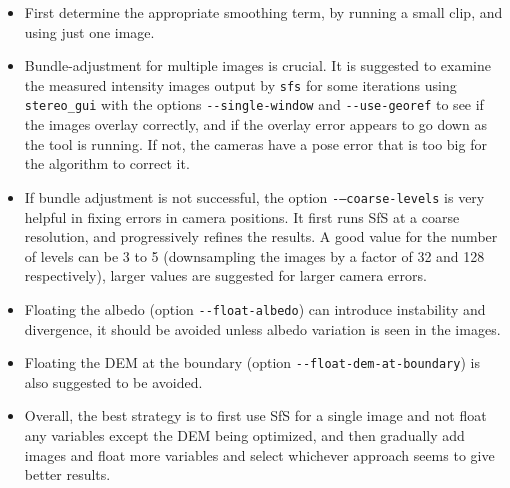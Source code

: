 \begin{itemize}{}
\item First determine the appropriate smoothing term, by running a small clip, and using just one image.

\item Bundle-adjustment for multiple images is crucial. It is suggested to examine the measured intensity images output by \texttt{sfs} for some iterations using \texttt{stereo\_gui} with the options \texttt{-\/-single-window} and \texttt{-\/-use-georef} to see if the images overlay correctly, and if the overlay error appears to go down as the tool is running. If not, the cameras have a pose error that is too big for the algorithm to correct it.

\item If bundle adjustment is not successful, the option
\texttt{-\/--coarse-levels} is very helpful in fixing errors in camera
positions. It first runs SfS at a coarse resolution, and progressively
refines the results. A good value for the number of levels can be 3 to 5
(downsampling the images by a factor of 32 and 128 respectively), larger
values are suggested for larger camera errors.

\item Floating the albedo (option \texttt{-\/-float-albedo}) can introduce instability and divergence, it should be avoided unless albedo variation is seen in the images.

\item Floating the DEM at the boundary (option \texttt{-\/-float-dem-at-boundary}) is also suggested to be avoided.

\item Overall, the best strategy is to first use SfS for a single image and not float any variables except the DEM being optimized, and then gradually add images and float more variables and select whichever approach seems to give better results.
\end{itemize}
